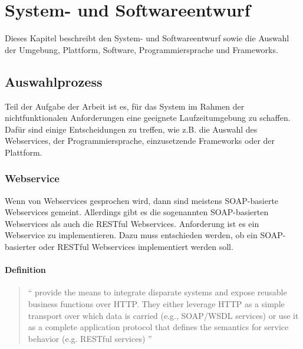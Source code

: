 \chapter{System- und Softwareentwurf} \label{kap:systemundsoftwarentwurf}


Dieses Kapitel beschreibt den System- und Softwareentwurf sowie die Auswahl der Umgebung, Plattform, Software, Programmiersprache und Frameworks.

\section{Auswahlprozess}

Teil der Aufgabe der Arbeit ist es, für das System im Rahmen der nichtfunktionalen Anforderungen eine geeignete Laufzeitumgebung zu schaffen. Dafür sind einige Entscheidungen zu treffen, wie z.B. die Auswahl des Webservices, der Programmiersprache, einzusetzende Frameworks oder der Plattform. 

\subsection{Webservice}\label{sec:webservice}
Wenn von \glspl{Webservice} gesprochen wird, dann sind meistens \gls{SOAP}-basierte \glspl{Webservice} gemeint. Allerdings gibt es die sogenannten \gls{SOAP}-basierten \glspl{Webservice} als auch die \gls{REST}ful \glspl{Webservice}. Anforderung ist es ein \gls{Webservice} zu implementieren. Dazu muss entschieden werden, ob ein \gls{SOAP}-basierter oder \gls{REST}ful \glspl{Webservice} implementiert werden soll. 

\subsubsection{Definition}

\begin{quotation}
\enquote{ provide the means to integrate disparate systems and expose reusable business functions over \gls{HTTP}. They either leverage \gls{HTTP} as a simple transport over which data is carried (e.g., \gls{SOAP}/\gls{WSDL} services) or use it as a complete application protocol that defines the semantics for service behavior (e.g. RESTful services) \citep[S. 2][]{robinsonService}}	
\end{quotation}

